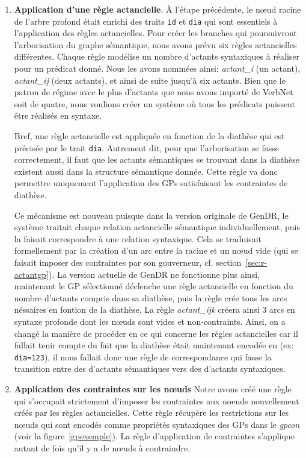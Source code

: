 \begin{enumerate}
	\item \textbf{Application d'une règle actancielle}.
	À l'étape précédente, le n\oe{}ud racine de l'arbre profond était enrichi des traits \texttt{id} et \texttt{dia} qui sont essentiels à l'application des règles actancielles. Pour créer les branches qui poursuivront l'arborisation du graphe sémantique, nous avons prévu six règles actancielles différentes. Chaque règle modélise un nombre d'actants syntaxiques à réaliser pour un prédicat donné. Nous les avons nommées ainsi: \emph{actant\_i} (un actant), \emph{actant\_ij} (deux actants), et ainsi de suite jusqu'à six actants. Bien que le patron de régime avec le plus d'actants que nous avons importé de VerbNet soit de quatre, nous voulions créer un système où tous les prédicats puissent être réalisés en syntaxe. 
	
	Bref, une règle actancielle est appliquée en fonction de la diathèse qui est précisée par le trait \texttt{dia}. Autrement dit, pour que l'arborisation se fasse correctement, il faut que les actants sémantiques se trouvant dans la diathèse existent aussi dans la structure sémantique donnée. Cette règle va donc permettre uniquement l'application des \acp{GP} satisfaisant les contraintes de diathèse.
	
	Ce mécanisme est nouveau puisque dans la version originale de GenDR, le système traitait chaque relation actancielle sémantique individuellement, puis la faisait correspondre à une relation syntaxique. Cela se traduisait formellement par la création d'un arc entre la racine et un n\oe{}ud vide (qui se faisait imposer des contraintes par son gouverneur, cf. section~\ref{sec:r-actantgp}). La version actuelle de GenDR ne fonctionne plus ainsi, maintenant le \ac{GP} sélectionné déclenche une règle actancielle en fonction du nombre d'actants compris dans sa diathèse, puis la règle crée tous les arcs néssaires en fontion de la diathèse. La règle \emph{actant\_ijk} créera ainsi 3 arcs en syntaxe profonde dont les n\oe{}uds sont vides et non-contraints. Ainsi, on a changé la manière de procéder en ce qui concerne les règles actancielles car il fallait tenir compte du fait que la diathèse était maintenant encodée en  (ex: \texttt{dia=123}), il nous fallait donc une règle de correspondance qui fasse la transition entre des  d'actants sémantiques vers des  d'actants syntaxiques.
	
	\item \textbf{Application des contraintes sur les n\oe{}uds}
Notre avons créé une règle qui s'occupait strictement d'imposer les contraintes aux noeuds nouvellement créés par les règles actancielles. Cette règle récupère les restrictions sur les n\oe{}uds qui sont encodés comme propriétés syntaxiques des \acp{GP} dans le \emph{gpcon} (voir la figure~\ref{gpexemple}). La règle d'application de contraintes s'applique autant de fois qu'il y a de n\oe{}uds à contraindre.


\end{enumerate}
